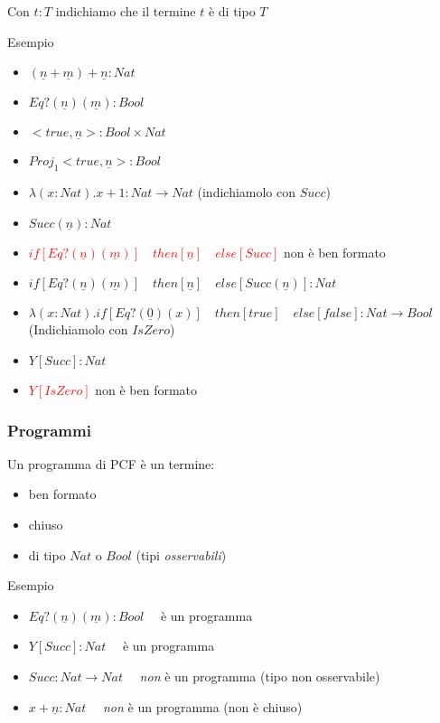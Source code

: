 \documentclass{beamer}
\begin{document}
\begin{frame}
	Con $t:T$ indichiamo che il termine $t$ è di tipo $T$
	\begin{block}{Esempio}
		\begin{itemize}
			\item $(\underline{n} + \underline{m})+ \underline{n} :Nat$
			\item $Eq?(\underline{n})(\underline{m}):Bool$
			\item $<true,\underline{n}>:Bool \times Nat$
			\item $Proj_1 <true,\underline{n}>:Bool$
			\item $\lambda (x:Nat) . x+1 : Nat\rightarrow Nat$ (indichiamolo con $Succ$)
			\item $Succ(\underline{n}):Nat$
			\item \textcolor{red}{$if[Eq?(\underline{n})(\underline{m})]\quad then [\underline{n}]
			\quad else[Succ]$} non è ben formato
			\item $if[Eq?(\underline{n})(\underline{m})]\quad then [\underline{n}]
			\quad else[ Succ(\underline{n}) ] :Nat$
			\item $\lambda(x:Nat).if[Eq?(\underline{0})(x)]\quad then [true]
			\quad else [false]: Nat \rightarrow Bool$ (Indichiamolo con $IsZero$)
			\item $Y [Succ]:Nat$
			\item \textcolor{red}{$Y[IsZero]$} non è ben formato
		\end{itemize}

	\end{block}

	
\end{frame}




\begin{frame}
	
	\frametitle{Programmi}
	
	Un programma di PCF è un termine:
	\begin{itemize}
		\item ben formato
		\item chiuso
		\item di tipo $Nat$ o $Bool$ (tipi \emph{osservabili})
	\end{itemize}

	
	\begin{block}{Esempio}
		\begin{itemize}
			\item $Eq?(\underline{n})(\underline{m}):Bool\quad$ è un programma
			\item $Y [Succ]:Nat\quad$ è un programma
			\item $Succ:Nat\rightarrow Nat\quad$ \emph{non} è un programma (tipo non osservabile)
			\item $x+\underline{n}:Nat\quad$ \emph{non} è un programma (non è chiuso)
		\end{itemize}

	\end{block}
	
\end{frame}
\end{document}
